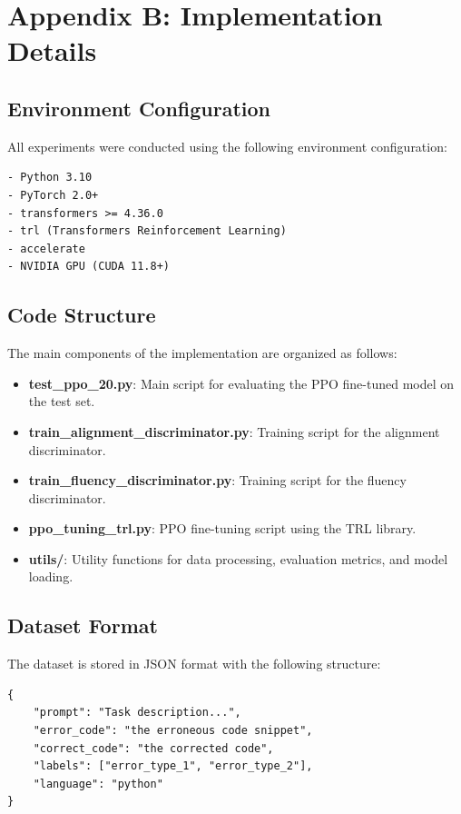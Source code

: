 \chapter*{Appendix B: Implementation Details}
\begingroup
\justifying
\setlength{\parindent}{0pt}
\setlength{\parskip}{0.5\baselineskip}

\section{Environment Configuration}

All experiments were conducted using the following environment configuration:

\begin{verbatim}
- Python 3.10
- PyTorch 2.0+
- transformers >= 4.36.0
- trl (Transformers Reinforcement Learning)
- accelerate
- NVIDIA GPU (CUDA 11.8+)
\end{verbatim}

\section{Code Structure}

The main components of the implementation are organized as follows:

\begin{itemize}
    \item \textbf{test\_ppo\_20.py}: Main script for evaluating the PPO fine-tuned model on the test set.
    \item \textbf{train\_alignment\_discriminator.py}: Training script for the alignment discriminator.
    \item \textbf{train\_fluency\_discriminator.py}: Training script for the fluency discriminator.
    \item \textbf{ppo\_tuning\_trl.py}: PPO fine-tuning script using the TRL library.
    \item \textbf{utils/}: Utility functions for data processing, evaluation metrics, and model loading.
\end{itemize}

\section{Dataset Format}

The dataset is stored in JSON format with the following structure:

\begin{verbatim}
{
    "prompt": "Task description...",
    "error_code": "the erroneous code snippet",
    "correct_code": "the corrected code",
    "labels": ["error_type_1", "error_type_2"],
    "language": "python"
}
\end{verbatim}

